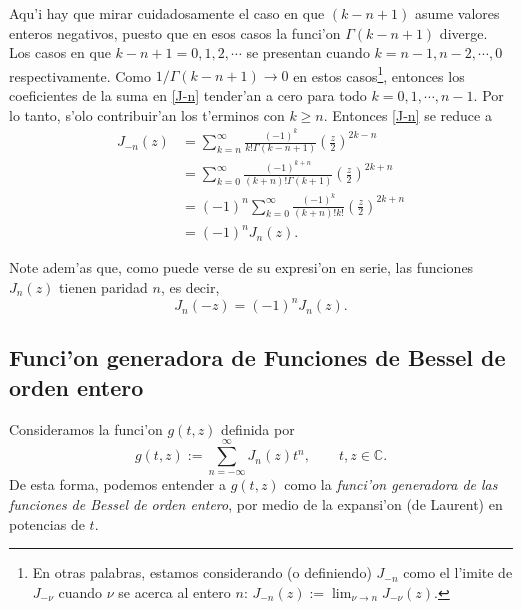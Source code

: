 Aqu'i hay que mirar cuidadosamente el caso en que $(k-n+ 1)$ asume valores enteros negativos, puesto que en esos casos la funci'on $\Gamma(k-n+ 1)$ diverge. Los casos en que $k-n+ 1=0,1,2,\cdots$ se presentan cuando $k=n-1,n-2,\cdots, 0$ respectivamente. Como $1/\Gamma(k-n+ 1)\to 0$ en estos casos\footnote{En otras palabras, estamos considerando (o definiendo) $J_{-n}$ como el l'imite de $J_{-\nu}$ cuando $\nu$ se acerca al entero $n$:  $J_{-n}(z):=\lim_{\nu\to n}J_{-\nu}(z)$.}, entonces los coeficientes de la suma en \eqref{J-n} tender'an a cero para todo $k=0,1,\cdots,n-1$. Por lo tanto, s'olo contribuir'an los t'erminos con $k\ge n$. Entonces \eqref{J-n} se reduce a
\begin{align}\label{J-n2}
J_{-n}(z) &= \sum_{k=n}^\infty \frac{(-1)^k}{k!\Gamma(k-n+ 1) }
\left(\frac{z}{2}\right)^{2k-n} \\
&= \sum_{k=0}^\infty \frac{(-1)^{k+n}}{(k+n)!\Gamma(k+1)}
\left(\frac{z}{2}\right)^{2k+n} \\
&= (-1)^n\sum_{k=0}^\infty \frac{(-1)^k}{(k+n)!k!}
\left(\frac{z}{2}\right)^{2k+n} \\
&= (-1)^n J_n(z).
\end{align}

Note adem'as que, como puede verse de su expresi'on en serie, las funciones $J_n(z)$ tienen paridad $n$, es decir,
\begin{equation}
J_n(-z)=(-1)^nJ_n(z).
\end{equation}

\subsection{Funci'on generadora de Funciones de Bessel de orden entero}
Consideramos la funci'on $g(t,z)$ definida por
\begin{equation}\label{defgtz}
g(t,z):=\sum_{n = -\infty}^\infty J_n(z) t^n, \qquad t,z\in \mathbb{C}.
\end{equation}
De esta forma, podemos entender a $g(t,z)$ como la \textit{funci'on generadora de las funciones de Bessel de orden entero}, por medio de la expansi'on (de Laurent) en potencias de $t$.

